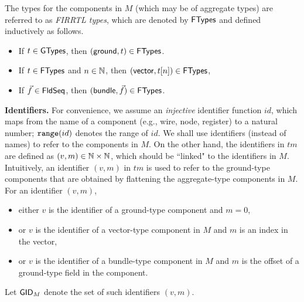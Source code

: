 The types for the components in $M$ (which may be of aggregate types) are referred to as \emph{FIRRTL types}, which are denoted by ${\sf FTypes}$ and  %
defined inductively as follows.
\begin{itemize}
\item If $t \in {\sf GTypes}$, then $({\sf ground}, t) \in {\sf FTypes}$.
%
\item If $t \in {\sf FTypes}$ and $n \in \mathbb{N}$, then $({\sf vector}, t[n]) \in {\sf FTypes}$,
%
\item If $\vec{f} \in {\sf FldSeq}$, then $({\sf bundle}, \vec{f}) \in {\sf FTypes}$.
\end{itemize}


\noindent\textbf{Identifiers.} For convenience, we assume an \emph{injective} identifier function $id$, which maps from the name of a component (e.g., wire, node, register) to a natural number; %
$\mathtt{range}(id)$ denotes the range of $id$.
We shall use identifiers (instead of names) to refer to the components in $M$. On the other hand, %
the identifiers in $tm$ are defined as $(v, m) \in \mathbb{N} \times \mathbb{N}$, which should be %
``linked" to the identifiers in $M$.
Intuitively, an identifier $(v, m)$ in $tm$ is used to refer to the ground-type components that are obtained by flattening the aggregate-type components in $M$. For an identifier $(v, m)$,
\begin{itemize}
\item either $v$ is the identifier of a ground-type component and $m = 0$,
%
\item or $v$ is the identifier of a vector-type component in $M$ and $m$ is an index in the vector,
%
\item or $v$ is the identifier of a bundle-type component in $M$ and $m$ is the offset of a ground-type field in the component.
\end{itemize}
Let $\mathsf{GID}_M$ denote the set of such identifiers $(v,m)$.

